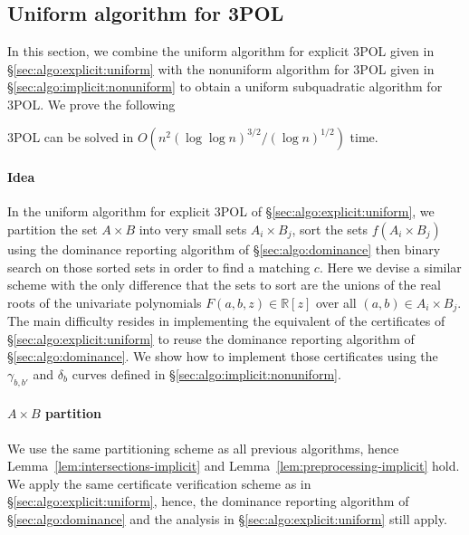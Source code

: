 \subsection{Uniform algorithm for 3POL}%
\label{sec:algo:implicit:uniform}

In this section, we combine the uniform algorithm for explicit 3POL given in
\S\ref{sec:algo:explicit:uniform} with the nonuniform algorithm for
3POL given in \S\ref{sec:algo:implicit:nonuniform} to obtain a uniform
subquadratic algorithm for 3POL\@.
We prove the following
\begin{theorem}\label{thm:implicit:uniform}
	3POL can be solved in
	$O(n^2 {(\log \log n)}^{3/2} / {(\log n)}^{1/2})$ time.
\end{theorem}

\paragraph{Idea}
In the uniform algorithm for explicit 3POL of
\S\ref{sec:algo:explicit:uniform}, we partition the set $A \times B$
into very small sets $A_i \times B_j$, sort the sets $f(A_i \times B_j)$ using
the dominance reporting algorithm of \S\ref{sec:algo:dominance} then
binary search on those sorted sets in order to find a matching $c$.
%
Here we devise a similar scheme with the only difference that the sets to sort
are the unions of the real roots of the univariate polynomials
$F(a,b,z)\in\mathbb{R}[z]$ over all $(a,b) \in A_i \times B_j$.
%
The main difficulty resides in implementing the
equivalent of the certificates of \S\ref{sec:algo:explicit:uniform} to reuse
the dominance reporting algorithm of \S\ref{sec:algo:dominance}. We show how to
implement those certificates using the $\gamma_{b,b'}$ and $\delta_b$ curves
defined in \S\ref{sec:algo:implicit:nonuniform}.

\paragraph{$A \times B$ partition}
We use the same partitioning scheme as all previous
algorithms, hence Lemma~\ref{lem:intersections-implicit} and
Lemma~\ref{lem:preprocessing-implicit} hold. We apply the same certificate verification
scheme as in \S\ref{sec:algo:explicit:uniform}, hence, the dominance
reporting algorithm of \S\ref{sec:algo:dominance} and the analysis
in \S\ref{sec:algo:explicit:uniform} still apply.

